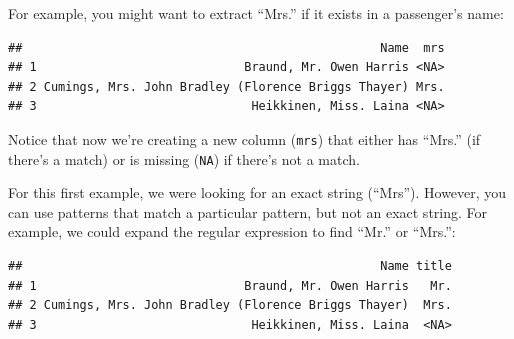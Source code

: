 \documentclass[]{book}
\makeatletter
\newenvironment{Shaded}{\begin{snugshade}}{\end{snugshade}}
\newcommand{\KeywordTok}[1]{\textcolor[rgb]{0.13,0.29,0.53}{\textbf{{#1}}}}
\newcommand{\DataTypeTok}[1]{\textcolor[rgb]{0.13,0.29,0.53}{{#1}}}
\newcommand{\DecValTok}[1]{\textcolor[rgb]{0.00,0.00,0.81}{{#1}}}
\newcommand{\CharTok}[1]{\textcolor[rgb]{0.31,0.60,0.02}{{#1}}}
\newcommand{\StringTok}[1]{\textcolor[rgb]{0.31,0.60,0.02}{{#1}}}
\newcommand{\NormalTok}[1]{{#1}}
\newenvironment{kframe}{%
\medskip{}
\setlength{\fboxsep}{.8em}
 \def\at@end@of@kframe{}%
 \ifinner\ifhmode%
  \def\at@end@of@kframe{\end{minipage}}%
  \begin{minipage}{\columnwidth}%
 \fi\fi%
 \def\FrameCommand##1{\hskip\@totalleftmargin \hskip-\fboxsep
 \colorbox{shadecolor}{##1}\hskip-\fboxsep
     \hskip-\linewidth \hskip-\@totalleftmargin \hskip\columnwidth}%
 \MakeFramed {\advance\hsize-\width
   \@totalleftmargin\z@ \linewidth\hsize
   \@setminipage}}%
 {\par\unskip\endMakeFramed%
 \at@end@of@kframe}
\renewenvironment{Shaded}{\begin{kframe}}{\end{kframe}}
\makeatother
\begin{document}
For example, you might want to extract ``Mrs.'' if it exists in a
passenger's name:

\begin{Shaded}
\end{Shaded}

\begin{verbatim}
##                                                  Name  mrs
## 1                             Braund, Mr. Owen Harris <NA>
## 2 Cumings, Mrs. John Bradley (Florence Briggs Thayer) Mrs.
## 3                              Heikkinen, Miss. Laina <NA>
\end{verbatim}

Notice that now we're creating a new column (\texttt{mrs}) that either
has ``Mrs.'' (if there's a match) or is missing (\texttt{NA}) if there's
not a match.

For this first example, we were looking for an exact string (``Mrs'').
However, you can use patterns that match a particular pattern, but not
an exact string. For example, we could expand the regular expression to
find ``Mr.'' or ``Mrs.'':

\begin{Shaded}
\end{Shaded}

\begin{verbatim}
##                                                  Name title
## 1                             Braund, Mr. Owen Harris   Mr.
## 2 Cumings, Mrs. John Bradley (Florence Briggs Thayer)  Mrs.
## 3                              Heikkinen, Miss. Laina  <NA>
\end{verbatim}
\end{document}
